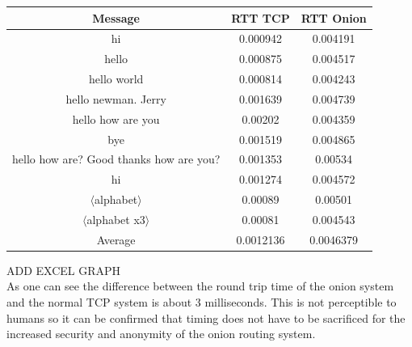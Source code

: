 \documentclass[10pt]{report}
\begin{document}
\begin{center}
    \begin{tabular}{|c|c|c|}
    \hline
    Message & RTT TCP & RTT Onion \\
    \hline
    hi & 0.000942 &	0.004191 \\
    hello &	0.000875 & 0.004517 \\
    hello world & 0.000814 & 0.004243 \\
    hello newman. Jerry & 0.001639 & 0.004739 \\
    hello how are you & 0.00202 & 0.004359 \\
    bye & 0.001519 & 0.004865 \\
    hello how are? Good thanks how are you? & 0.001353 & 0.00534 \\
    hi & 0.001274 & 0.004572 \\
    $\langle$alphabet$\rangle$ & 0.00089 & 0.00501 \\
    $\langle$alphabet x3$\rangle$ & 0.00081 & 0.004543 \\
    \hline
    Average & 0.0012136 & 0.0046379 \\
    \hline
    \end{tabular}
\end{center}
ADD EXCEL GRAPH\\
As one can see the difference between the round trip time of the onion system and the normal TCP system is about 3 milliseconds. This is not perceptible to humans so it can be confirmed that timing does not have to be sacrificed for the increased security and anonymity of the onion routing system.
\end{document}
